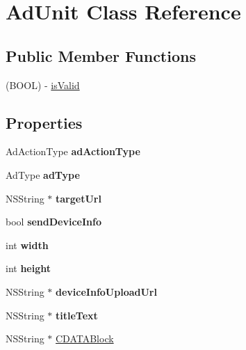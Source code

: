 \hypertarget{interface_ad_unit}{
\section{AdUnit Class Reference}
\label{interface_ad_unit}
}
\subsection*{Public Member Functions}
\begin{DoxyCompactItemize}
\item 
(BOOL) -\/ \hyperlink{interface_ad_unit_a584c541a6df22513735a8249fecc56e5}{isValid}
\end{DoxyCompactItemize}
\subsection*{Properties}
\begin{DoxyCompactItemize}
\item 
\hypertarget{interface_ad_unit_a51f3e1c1caab04c7b6869c52ec3c8408}{
AdActionType {\bfseries adActionType}}
\label{interface_ad_unit_a51f3e1c1caab04c7b6869c52ec3c8408}

\item 
\hypertarget{interface_ad_unit_af14daaf589a89a9d8e70029fbff64296}{
AdType {\bfseries adType}}
\label{interface_ad_unit_af14daaf589a89a9d8e70029fbff64296}

\item 
\hypertarget{interface_ad_unit_a1c3dd04bbd9eb7b9705c936fddf7a604}{
NSString $\ast$ {\bfseries targetUrl}}
\label{interface_ad_unit_a1c3dd04bbd9eb7b9705c936fddf7a604}

\item 
\hypertarget{interface_ad_unit_ae3cf2bd93a579dc2f93a6c1e660d7ccb}{
bool {\bfseries sendDeviceInfo}}
\label{interface_ad_unit_ae3cf2bd93a579dc2f93a6c1e660d7ccb}

\item 
\hypertarget{interface_ad_unit_a6226f37c1dfcc48d2620e9d6ef81ca41}{
int {\bfseries width}}
\label{interface_ad_unit_a6226f37c1dfcc48d2620e9d6ef81ca41}

\item 
\hypertarget{interface_ad_unit_a9233f5add512c2d70c1f1e8f3215355e}{
int {\bfseries height}}
\label{interface_ad_unit_a9233f5add512c2d70c1f1e8f3215355e}

\item 
\hypertarget{interface_ad_unit_a2c8f131315b75126eebefd6dad659d8c}{
NSString $\ast$ {\bfseries deviceInfoUploadUrl}}
\label{interface_ad_unit_a2c8f131315b75126eebefd6dad659d8c}

\item 
\hypertarget{interface_ad_unit_ae99a30d3a7657a1cd6ee77be80fb9d88}{
NSString $\ast$ {\bfseries titleText}}
\label{interface_ad_unit_ae99a30d3a7657a1cd6ee77be80fb9d88}

\item 
NSString $\ast$ \hyperlink{interface_ad_unit_a9ccdde03d154cea8e01600ab691eca63}{CDATABlock}
\end{DoxyCompactItemize}


